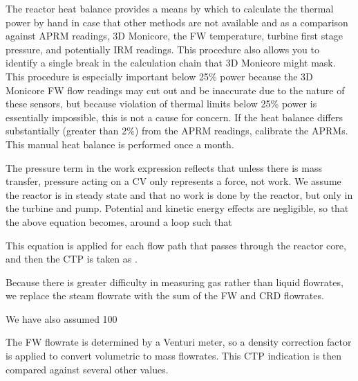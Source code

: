 \documentclass[10pt]{article}
\begin{document}
The reactor heat balance provides a means by which to calculate the thermal power by hand in case that other methods are not available and as a comparison against APRM readings, 3D Monicore, the FW temperature, turbine first stage pressure, and potentially IRM readings. This procedure also allows you to identify a single break in the calculation chain that 3D Monicore might mask. This procedure is especially important below 25\% power because the 3D Monicore FW flow readings may cut out and be inaccurate due to the nature of these sensors, but because violation of thermal limits below 25\% power is essentially impossible, this is not a cause for concern. If the heat balance differs substantially (greater than 2\%) from the APRM readings, calibrate the APRMs. This manual heat balance is performed once a month. 







The pressure term in the work expression reflects that unless there is mass transfer, pressure acting on a CV only represents a force, not work. We assume the reactor is in steady state and that no work is done by the reactor, but only in the turbine and pump. Potential and kinetic energy effects are negligible, so that the above equation becomes, around a loop such that 


This equation is applied for each flow path that passes through the reactor core, and then the CTP is taken as . 







Because there is greater difficulty in measuring gas rather than liquid flowrates, we replace the steam flowrate with the sum of the FW and CRD flowrates. 



We have also assumed 100%



The FW flowrate is determined by a Venturi meter, so a density correction factor is applied to convert volumetric to mass flowrates. This CTP indication is then compared against several other values. 
\end{document}
